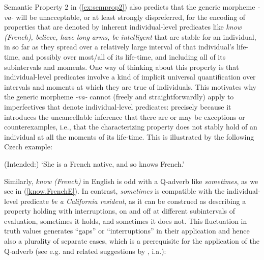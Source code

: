 \documentclass[output=paper,colorlinks,citecolor=brown]{langscibook}
\begin{document}
\noindent Semantic Property 2 in (\ref{ex:semprop2}) also predicts
that the generic morpheme \textit{-va-} will be unacceptable, or at least strongly dispreferred, for the encoding of properties that are
denoted by inherent individual-level predicates like \textit{know (French), believe, have long arms, be intelligent}
that are stable for an individual, in so far as they spread over a relatively large interval of that individual's life-time,
and possibly over most/all of its life-time, and including all of its subintervals and moments.  One way of thinking about this property is that
individual-level predicates involve a kind of implicit universal quantification over intervals and moments at which they are true of individuals.
This motivates why the  generic morpheme \textit{-va-} cannot (freely
and straightforwardly) apply to imperfectives that denote individual-level predicates: precisely because
it introduces the uncancellable inference that there are or may be exceptions or counterexamples, i.e.,
that the characterizing property does not stably hold of an individual at all
the moments of its life-time.
This is illustrated by the following Czech example:

\glt (Intended:) `She is a French native, and so knows French.'
\z

\noindent Similarly, \textit{know (French)} in English is odd
with a Q-adverb like \textit{sometimes}, as we see in (\ref{know.FrenchE}).
In contrast, \textit{sometimes} is compatible with the individual-level predicate \textit{be a California resident}, as it can be construed as describing
a property holding with interruptions,
on and off at different subintervals
of evaluation, sometimes it holds, and sometimes it does not.
This fluctuation in truth values generates ``gaps'' or ``interruptions''
in their application and hence also a plurality of separate cases,
which is a prerequisite for the application of the Q-adverb (see e.g. \citealt{fernald2000} and related suggestions by \citealt{deswart1991adverbs}, i.a.):
\end{document}
